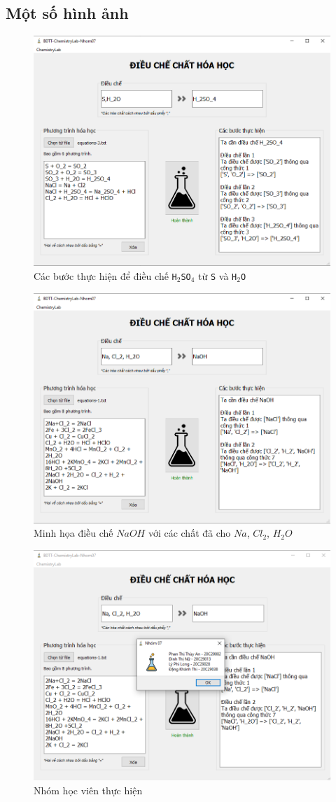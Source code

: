 \documentclass[a4paper]{article}
\begin{document}
	\subsection{Một số hình ảnh}
		\begin{figure}[h]
			\centering
			\includegraphics[width=0.7\linewidth]{images/app-done-2}
			\caption{Các bước thực hiện để điều chế \texttt{H$_2$SO$_4$} từ \texttt{S} và \texttt{H$_2$O}}
			\label{fig:app-done-2}
		\end{figure}
		
		\begin{figure}
			\centering
			\includegraphics[width=0.7\linewidth]{images/app-done}
			\caption{Minh họa điều chế $NaOH$ với các chất đã cho $Na$, $Cl_2$, $H_2O$}
			\label{fig:app-done}
		\end{figure}
		
		\begin{figure}[h]
			\centering
			\includegraphics[width=0.7\linewidth]{images/app-authors}
			\caption{Nhóm học viên thực hiện}
			\label{fig:app-authors}
		\end{figure}
\end{document}
